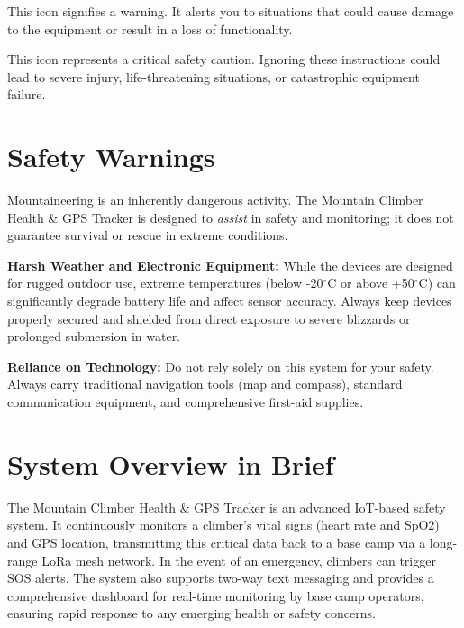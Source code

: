 \begin{warningbox}
This icon signifies a warning. It alerts you to situations that could cause damage to the equipment or result in a loss of functionality.
\end{warningbox}

\begin{cautionbox}
This icon represents a critical safety caution. Ignoring these instructions could lead to severe injury, life-threatening situations, or catastrophic equipment failure.
\end{cautionbox}

\section{Safety Warnings}
Mountaineering is an inherently dangerous activity. The Mountain Climber Health \& GPS Tracker is designed to \textit{assist} in safety and monitoring; it does not guarantee survival or rescue in extreme conditions.

\begin{cautionbox}
\textbf{Harsh Weather and Electronic Equipment:} 
While the devices are designed for rugged outdoor use, extreme temperatures (below -20$^\circ$C or above +50$^\circ$C) can significantly degrade battery life and affect sensor accuracy. Always keep devices properly secured and shielded from direct exposure to severe blizzards or prolonged submersion in water.
\end{cautionbox}

\begin{warningbox}
\textbf{Reliance on Technology:} Do not rely solely on this system for your safety. Always carry traditional navigation tools (map and compass), standard communication equipment, and comprehensive first-aid supplies.
\end{warningbox}

\section{System Overview in Brief}
The Mountain Climber Health \& GPS Tracker is an advanced IoT-based safety system. It continuously monitors a climber's vital signs (heart rate and SpO2) and GPS location, transmitting this critical data back to a base camp via a long-range LoRa mesh network. In the event of an emergency, climbers can trigger SOS alerts. The system also supports two-way text messaging and provides a comprehensive dashboard for real-time monitoring by base camp operators, ensuring rapid response to any emerging health or safety concerns.
